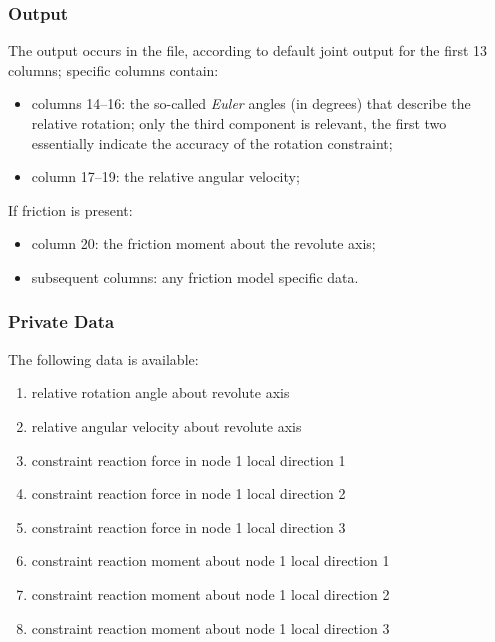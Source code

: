 \subsubsection{Output}
The output occurs in the  file, according to default joint output
for the first 13 columns; specific columns contain:
\begin{itemize}
\item columns 14--16: the so-called \emph{Euler} angles (in degrees)
	that describe the relative rotation; only the third component
	is relevant, the first two essentially indicate the accuracy
	of the rotation constraint;
\item column 17--19: the relative angular velocity;
\end{itemize}
If friction is present:
\begin{itemize}
\item column 20: the friction moment about the revolute axis;
\item subsequent columns: any friction model specific data.
\end{itemize}

\subsubsection{Private Data}
The following data is available:
\begin{enumerate}
\item {} relative rotation angle about revolute axis
\item {} relative angular velocity about revolute axis
\item {} constraint reaction force in node 1 local direction 1
\item {} constraint reaction force in node 1 local direction 2
\item {} constraint reaction force in node 1 local direction 3
\item {} constraint reaction moment about node 1 local direction 1
\item {} constraint reaction moment about node 1 local direction 2
\item {} constraint reaction moment about node 1 local direction 3
\end{enumerate}

